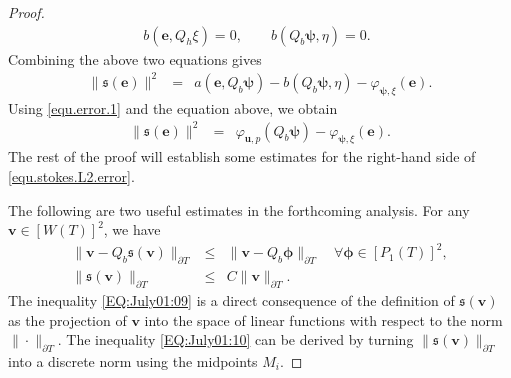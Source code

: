 \documentclass[final,leqno]{siamltex704}
\def\S{{\mathfrak s}}
\def\pT{{\partial T}}
\begin{document}
\begin{proof}
\begin{eqnarray}
b(\bm{e},Q_h \xi)=0,\qquad b( Q_b \bm{\psi},\eta)=0.~~
\end{eqnarray}
Combining the above two equations gives
\begin{eqnarray}
 \|\S(\bm{e})\|^2 &=& a(\bm{e},Q_b \bm{\psi})-b( Q_b \bm{\psi},\eta)-\varphi_{\bm{\psi},\xi}(\bm{e}).
\end{eqnarray}
Using \eqref{equ.error.1} and the equation above, we obtain
\begin{eqnarray}\label{equ.stokes.L2.error}
 \|\S(\bm{e})\|^2 &=& \varphi_{\bm{u},p}(Q_b \bm{\psi}) -\varphi_{\bm{\psi},\xi}(\bm{e}).
\end{eqnarray}
The rest of the proof will establish some estimates for the right-hand side of \eqref{equ.stokes.L2.error}.

The following are two useful estimates in the forthcoming analysis. For any $\bm{v}\in [W(T)]^2$, we have
\begin{eqnarray}
  \|\bm{v} - Q_b\S(\bm{v})\|_{\pT} & \leq & \|\bm{v} - Q_b\bm{\phi}\|_{\pT}\quad \forall \bm{\phi}\in [P_1(T)]^2,\label{EQ:July01:09}\\
  \|\S(\bm{v})\|_\pT & \leq & C \|\bm{v}\|_\pT. \label{EQ:July01:10}
\end{eqnarray}
The inequality \eqref{EQ:July01:09} is a direct consequence of the definition of $\S(\bm{v})$ as the projection of $\bm{v}$ into the space of linear functions with respect to the norm $\|\cdot\|_\pT$. The inequality \eqref{EQ:July01:10} can be derived by turning $\|\S(\bm{v})\|_\pT$ into a discrete norm using the midpoints $M_i$.


\end{proof}
\end{document}
